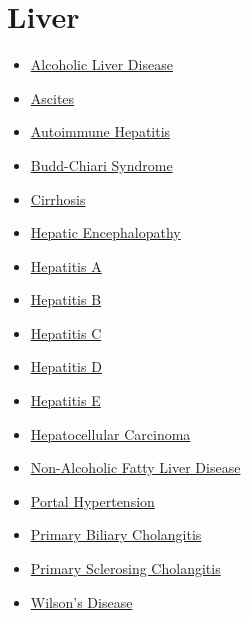 \section*{Liver}
\label{sec:organ_liver}
\begin{itemize}[noitemsep]
  \item \hyperlink{sec:Alcoholic Liver Disease}{Alcoholic Liver Disease}
  \item \hyperlink{sec:Ascites}{Ascites}
  \item \hyperlink{sec:Autoimmune Hepatitis}{Autoimmune Hepatitis}
  \item \hyperlink{sec:Budd-Chiari Syndrome}{Budd-Chiari Syndrome}
  \item \hyperlink{sec:Cirrhosis}{Cirrhosis}
  \item \hyperlink{sec:Hepatic Encephalopathy}{Hepatic Encephalopathy}
  \item \hyperlink{sec:Hepatitis A}{Hepatitis A}
  \item \hyperlink{sec:Hepatitis B}{Hepatitis B}
  \item \hyperlink{sec:Hepatitis C}{Hepatitis C}
  \item \hyperlink{sec:Hepatitis D}{Hepatitis D}
  \item \hyperlink{sec:Hepatitis E}{Hepatitis E}
  \item \hyperlink{sec:Hepatocellular Carcinoma}{Hepatocellular Carcinoma}
  \item \hyperlink{sec:Non-Alcoholic Fatty Liver Disease}{Non-Alcoholic Fatty Liver Disease}
  \item \hyperlink{sec:Portal Hypertension}{Portal Hypertension}
  \item \hyperlink{sec:Primary Biliary Cholangitis}{Primary Biliary Cholangitis}
  \item \hyperlink{sec:Primary Sclerosing Cholangitis}{Primary Sclerosing Cholangitis}
  \item \hyperlink{sec:Wilson's Disease}{Wilson's Disease}
\end{itemize}

